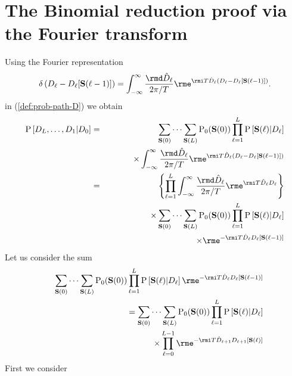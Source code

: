 \documentclass[10pt]{iopart}
\newcommand{\1}{\mathbf{1}}
\newcommand{\Prob}{\mathrm{P}}
\newcommand{\Sm}{\ensuremath{\mathbf{S}}}
\begin{document}
\section{The Binomial reduction proof via the  Fourier transform}
Using the Fourier representation 
%
\begin{eqnarray}
\delta\left(D_{\ell}-D_{\ell}[\Sm(\ell-1)]\right)=\int_{-\infty}^{\infty}\frac{\rmd\hat{D}_\ell}{2\pi/T}\rme^{\rmi T\hat{D}_\ell\left(D_{\ell}-D_{\ell}[\Sm(\ell-1)]\right)}.
\end{eqnarray}
%
in (\ref{def:prob-path-D}) we obtain
%
\begin{eqnarray}
\Prob\left[D_{L},\ldots,D_{1}\vert D_{0}\right]&=&\sum_{\Sm(0)}\cdots\sum_{\Sm(L)}\Prob_0(\Sm(0))\prod_{\ell=1}^L\Prob\left[\Sm(\ell)\vert D_{\ell}\right]\nonumber\\
&&~~~~~~~~~\times\int_{-\infty}^{\infty}\frac{\rmd\hat{D}_\ell}{2\pi/T}\rme^{\rmi T\hat{D}_\ell\left(D_{\ell}-D_{\ell}[\Sm(\ell-1)]\right)}\nonumber\\%
%
&=&\left\{\prod_{\ell=1}^L\int_{-\infty}^{\infty}\frac{\rmd\hat{D}_\ell}{2\pi/T}\rme^{\rmi T\hat{D}_\ell D_{\ell}}\right\}\nonumber\\
&&\times\sum_{\Sm(0)}\cdots\sum_{\Sm(L)}\Prob_0(\Sm(0))\prod_{\ell=1}^L\Prob\left[\Sm(\ell)\vert D_{\ell}\right]\nonumber\\
&&~~~~~~~~~\times\rme^{-\rmi T\hat{D}_\ell D_{\ell}[\Sm(\ell-1)]}
%
\end{eqnarray}
%
Let us consider the sum 
%
\begin{eqnarray}
&&\sum_{\Sm(0)}\cdots\sum_{\Sm(L)}\Prob_0(\Sm(0))\prod_{\ell=1}^L\Prob\left[\Sm(\ell)\vert D_{\ell}\right]\rme^{-\rmi T\hat{D}_\ell D_{\ell}[\Sm(\ell-1)]}\nonumber\\
%
&&=\sum_{\Sm(0)}\cdots\sum_{\Sm(L)}\Prob_0(\Sm(0))\prod_{\ell=1}^L\Prob\left[\Sm(\ell)\vert D_{\ell}\right]\nonumber\\
%
&&\times\prod_{\ell=0}^{L-1}\rme^{-\rmi T\hat{D}_{\ell+1} D_{\ell+1}[\Sm(\ell)]}
%
\end{eqnarray}
%
First we consider
%
\end{document}
